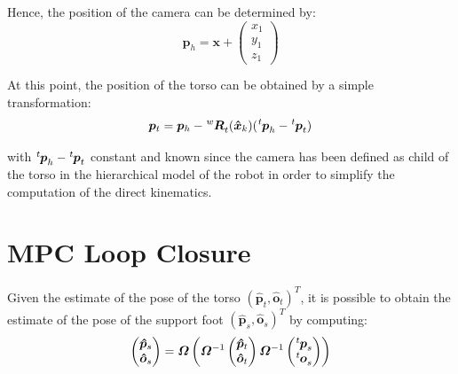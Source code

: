 \documentclass[a4paper]{article}
\begin{document}
Hence, the position of the camera can be determined by:
\begin{equation}
    \bm{p}_h
        =
    \bm{x} +
    \begin{pmatrix}
        x_1 \\
        y_1 \\
        z_1
    \end{pmatrix}
\end{equation}


At this point, the position of the torso can be obtained by
a simple transformation:
\begin{equation}
    \label{eq:torso-position-trilateration}
    \bm{p}_t = \bm{p}_h - \tensor[^w]{\bm{R}}{_t}(\bm{\hat{x}}_{k}) (\tensor[^t]{\bm{p}}{_h} - \tensor[^t]{\bm{p}}{_t})
\end{equation}

\noindent with $\tensor[^t]{\bm{p}}{_h} - \tensor[^t]{\bm{p}}{_t}$
constant and known
since the camera has been defined as child of the torso in
the hierarchical model of the robot in order to simplify the
computation of the direct kinematics.

\section{MPC Loop Closure}
\label{section:mpc-loop-closure}
Given the estimate of the pose of the torso
$(\bm{\hat{p}}_t, \bm{\hat{o}}_t)^T$,
it is possible to obtain the estimate of the pose of the support foot
$(\bm{\hat{p}}_s, \bm{\hat{o}}_s)^T$ by computing:
\begin{equation}
    \begin{pmatrix}
        \bm{\hat{p}}_s \\
        \bm{\hat{o}}_s
    \end{pmatrix} = \bm{\varOmega}\left(\bm{\varOmega}^{-1}
        \begin{pmatrix}
            \bm{\hat{p}}_t \\
            \bm{\hat{o}}_t
        \end{pmatrix}\bm{\varOmega}^{-1}
        \begin{pmatrix}
            \tensor[^t]{\bm{p}}{_s} \\
            \tensor[^t]{\bm{o}}{_s}
        \end{pmatrix}
    \right)
\end{equation}
\end{document}
